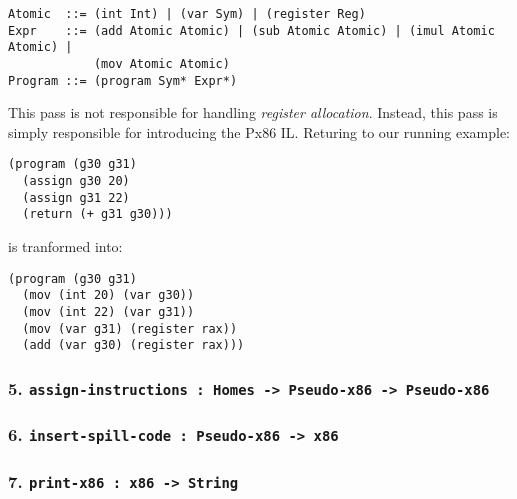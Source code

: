 \documentclass[12pt]{article}
\begin{document}
\begin{verbatim}
Atomic  ::= (int Int) | (var Sym) | (register Reg)
Expr    ::= (add Atomic Atomic) | (sub Atomic Atomic) | (imul Atomic Atomic) |
            (mov Atomic Atomic)
Program ::= (program Sym* Expr*)
\end{verbatim}

This pass is not responsible for handling \textit{register allocation}. Instead,
this pass is simply responsible for introducing the Px86 IL. Returing to our
running example:
\begin{verbatim}
(program (g30 g31) 
  (assign g30 20)
  (assign g31 22)
  (return (+ g31 g30)))
\end{verbatim}
is tranformed into:
\begin{verbatim}
(program (g30 g31)
  (mov (int 20) (var g30))
  (mov (int 22) (var g31))
  (mov (var g31) (register rax))
  (add (var g30) (register rax)))
\end{verbatim}
\subsubsection*{5. {\tt assign-instructions : Homes -> Pseudo-x86 -> Pseudo-x86}}
\subsubsection*{6. {\tt insert-spill-code : Pseudo-x86 -> x86}}
\subsubsection*{7. {\tt print-x86 : x86 -> String}}
\end{document}

